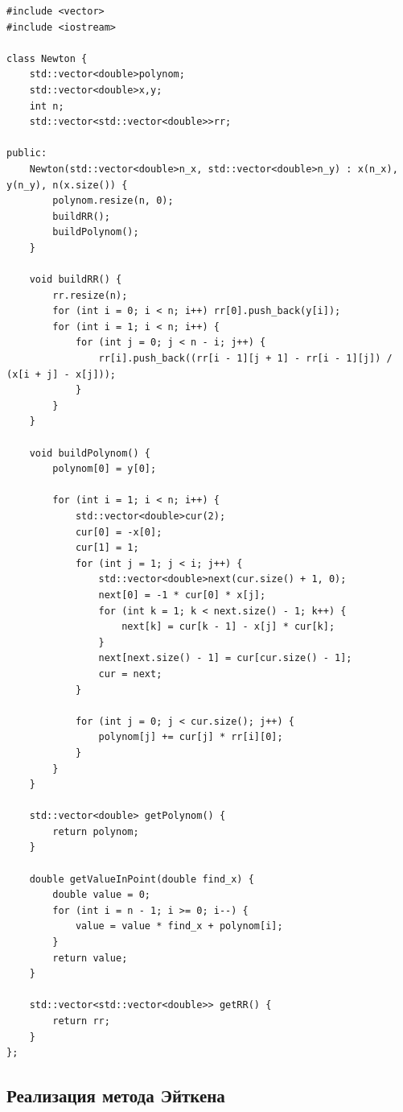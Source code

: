 \documentclass[12pt,a4paper]{article}
\begin{document}
\begin{lstlisting}
#include <vector>
#include <iostream>

class Newton {
    std::vector<double>polynom;
    std::vector<double>x,y;
    int n;
    std::vector<std::vector<double>>rr;

public:
    Newton(std::vector<double>n_x, std::vector<double>n_y) : x(n_x), y(n_y), n(x.size()) {
        polynom.resize(n, 0);
        buildRR();
        buildPolynom();
    }

    void buildRR() {
        rr.resize(n);
        for (int i = 0; i < n; i++) rr[0].push_back(y[i]);
        for (int i = 1; i < n; i++) {
            for (int j = 0; j < n - i; j++) {
                rr[i].push_back((rr[i - 1][j + 1] - rr[i - 1][j]) / (x[i + j] - x[j]));
            }
        }
    }

    void buildPolynom() {
        polynom[0] = y[0];
        
        for (int i = 1; i < n; i++) {
            std::vector<double>cur(2);
            cur[0] = -x[0];
            cur[1] = 1;
            for (int j = 1; j < i; j++) {
                std::vector<double>next(cur.size() + 1, 0);
                next[0] = -1 * cur[0] * x[j];
                for (int k = 1; k < next.size() - 1; k++) {
                    next[k] = cur[k - 1] - x[j] * cur[k];
                }
                next[next.size() - 1] = cur[cur.size() - 1];
                cur = next;
            }

            for (int j = 0; j < cur.size(); j++) {
                polynom[j] += cur[j] * rr[i][0];
            }
        }
    }

    std::vector<double> getPolynom() {
        return polynom;
    }

    double getValueInPoint(double find_x) {
        double value = 0;
        for (int i = n - 1; i >= 0; i--) {
            value = value * find_x + polynom[i];
        }
        return value;
    }

    std::vector<std::vector<double>> getRR() {
        return rr;
    }
};
\end{lstlisting}

\subsection{Реализация метода Эйткена}
\end{document}
